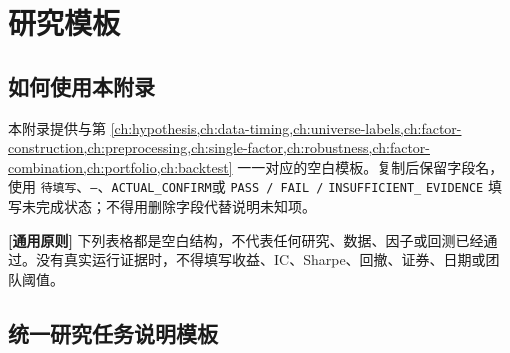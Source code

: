 \chapter{研究模板}
\label{app:templates}

\newcommand{\quantblank}{\texttt{待填写}}
\newcommand{\quantdash}{\texttt{--}}
\newcommand{\quantconfirm}{\texttt{ACTUAL\_CONFIRM}}
\newcommand{\quantresult}{%
  \texttt{PASS / FAIL /}\newline
  \texttt{INSUFFICIENT\_}\newline
  \texttt{EVIDENCE}%
}

\section{如何使用本附录}

本附录提供与第 \cref{ch:hypothesis,ch:data-timing,ch:universe-labels,ch:factor-construction,ch:preprocessing,ch:single-factor,ch:robustness,ch:factor-combination,ch:portfolio,ch:backtest} 一一对应的空白模板。复制后保留字段名，使用 \quantblank、\quantdash、\quantconfirm 或 \quantresult 填写未完成状态；不得用删除字段代替说明未知项。

\begin{principlebox}
\textbf{[通用原则]} 下列表格都是空白结构，不代表任何研究、数据、因子或回测已经通过。没有真实运行证据时，不得填写收益、IC、Sharpe、回撤、证券、日期或团队阈值。
\end{principlebox}

\section{统一研究任务说明模板}

